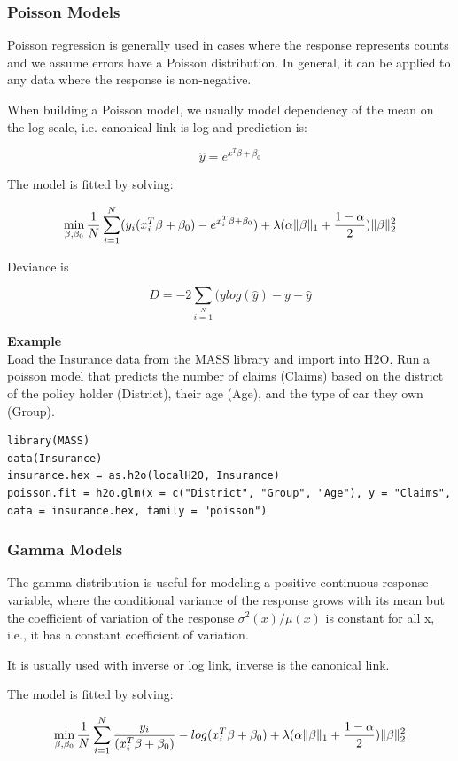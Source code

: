 \subsubsection{Poisson Models}
Poisson regression is generally used in cases where the response represents counts and we assume errors have a Poisson distribution. In general, it can be applied to any data where the response is non-negative. 

When building a Poisson model, we usually model dependency of the mean on the log scale, i.e. canonical link is log and prediction is:

\[\hat{y} = e^{x^T\beta + \beta_0}\]

The model is fitted by solving:

\[  \min\limits_{\beta,\beta_0} { {1 \over N}\sum\limits_{i=1}\limits^{N}(y_i (x_i^{T}\beta  + \beta_0) - e^{x_i^{T}\beta  + \beta_0})  + \lambda (\alpha \|\beta \|_1 + {1-\alpha \over 2}) \| \beta \|_2^2} \]

Deviance is 

\[D = -2\sum\limits_{i=1}\limits^{N}{(y log(\hat{y}) - y - \hat{y}}\]

\textbf{Example}\\

Load the Insurance data from the MASS library and import into H2O. Run a poisson model that predicts the number of claims (Claims) based on the district of the policy holder (District), their age (Age), and the type of car they own (Group).
\begin{lstlisting}[style=R]
library(MASS)
data(Insurance)
insurance.hex = as.h2o(localH2O, Insurance)
poisson.fit = h2o.glm(x = c("District", "Group", "Age"), y = "Claims", data = insurance.hex, family = "poisson")
\end{lstlisting}

\subsubsection{Gamma Models}
The gamma distribution is useful for modeling a positive continuous response variable, where the conditional variance of the response grows with its mean but  the coefficient of variation of the response $\sigma^2(x)/μ(x)$ is constant for all x,  i.e., it has a constant coefficient of variation.

It is usually used with inverse or log link, inverse is the canonical link.

The model is fitted by solving:

\[  \min\limits_{\beta,\beta_0} { {1 \over N}\sum\limits_{i=1}\limits^{N}{y_i \over (x_i^{T}\beta  + \beta_0)} - log({x_i^{T}\beta  + \beta_0})  + \lambda (\alpha \|\beta \|_1 + {1-\alpha \over 2}) \| \beta \|_2^2} \]

